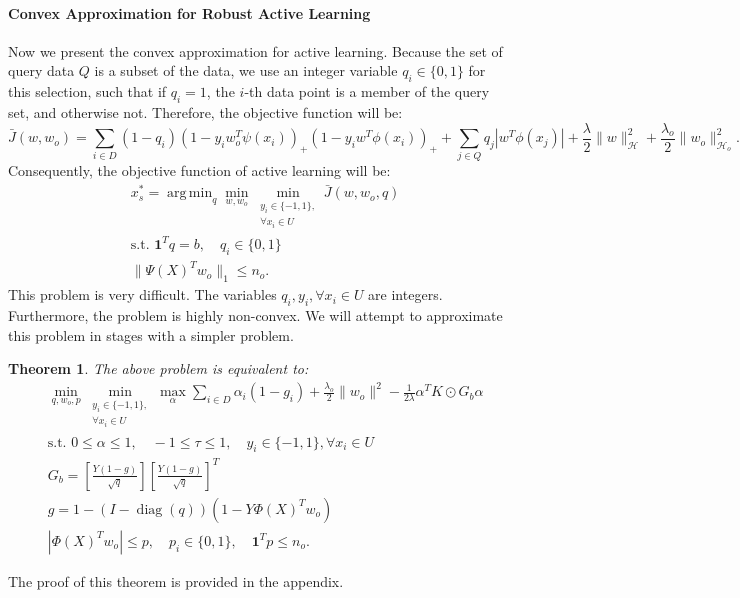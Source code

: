\documentclass[12pt]{article}
\newtheorem{theorem}{Theorem}[section]
\DeclareMathOperator*{\argmin}{arg\,min}
\DeclareMathOperator{\diag}{diag}
\begin{document}
	\paragraph{Convex Approximation for Robust Active Learning}
	Now we present the convex approximation for active learning. Because the set of query data $Q$ is a subset of the data, we use an integer variable $q_i \in \{0, 1\}$ for this selection, such that if $q_i = 1$, the $i$-th data point is a member of the query set, and otherwise not. Therefore, the objective function will be:
	\begin{equation}
		\label{eq:ral-obj}
		\bar{J}(w, w_o) = \sum_{i \in D} (1 - q_i)(1 - y_i w_o^T \psi(x_i))_+ (1 - y_i w^T \phi(x_i))_+ + \sum_{j \in Q} q_j |w^T \phi(x_j)| + \frac{\lambda}{2}\|w\|^2_{\mathcal{H}} + \frac{\lambda_o}{2}\|w_o\|^2_{\mathcal{H}_o}.
	\end{equation}
	Consequently, the objective function of active learning will be:
	\begin{subequations}
		\label{eq:ral-final}
		\begin{align}
			&x^*_s = \argmin_{q} \min_{w, w_o} \min_{\substack{y_i \in \{-1, 1\}, \\ \forall x_i \in U}} \bar{J}(w, w_o, q) \\
			&\text{s.t. } \mathbf{1}^T q = b, \quad q_i \in \{0, 1\} \\
			&\|\Psi(X)^T w_o\|_1 \le n_o.
		\end{align}
	\end{subequations}
	This problem is very difficult. The variables $q_i, y_i, \forall x_i \in U$ are integers. Furthermore, the problem is highly non-convex. We will attempt to approximate this problem in stages with a simpler problem.
	
	\begin{theorem}
		The above problem is equivalent to:
		\begin{subequations}
			\label{eq:ral-dual-theorem}
			\begin{align}
				&\min_{q, w_o, p} \min_{\substack{y_i \in \{-1, 1\}, \\ \forall x_i \in U}} \max_{\alpha} \sum_{i \in D} \alpha_i (1 - g_i) + \frac{\lambda_o}{2}\|w_o\|^2 - \frac{1}{2\lambda} \alpha^T K \odot G_b \alpha \\
				&\text{s.t. } 0 \le \alpha \le 1, \quad -1 \le \tau \le 1, \quad y_i \in \{-1, 1\}, \forall x_i \in U \\
				&G_b = \left[\frac{Y(1-g)}{\sqrt{q}}\right] \left[\frac{Y(1-g)}{\sqrt{q}}\right]^T \\
				&g = 1 - (I - \diag(q))(1 - Y \Phi(X)^T w_o) \\
				&|\Phi(X)^T w_o| \le p, \quad p_i \in \{0, 1\}, \quad \mathbf{1}^T p \le n_o.
			\end{align}
		\end{subequations}
	\end{theorem}
	The proof of this theorem is provided in the appendix.
	
\end{document}
